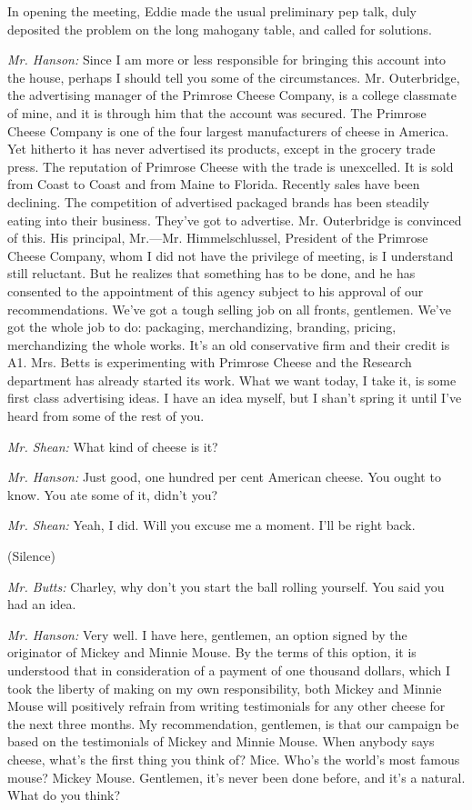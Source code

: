 \documentclass[twoside,nohyper,openany,nobib]{tufte-book}
\begin{document}
In opening the meeting, Eddie made the usual preliminary pep talk, duly
deposited the problem on the long mahogany table, and called for
solutions.

\emph{Mr. Hanson:} Since I am more or less responsible for bringing this
account into the house, perhaps I should tell you some of the
circumstances. Mr. Outerbridge, the advertising manager of the Primrose
Cheese Company, is a college classmate of mine, and it is through him
that the account was secured. The Primrose Cheese Company is one of the
four largest manufacturers of cheese in America. Yet hitherto it has
never advertised its products, except in the grocery trade press. The
reputation of Primrose Cheese with the trade is unexcelled. It is sold
from Coast to Coast and from Maine to Florida. Recently sales have been
declining. The competition of advertised packaged brands has been
steadily eating into their business. They've got to advertise. Mr.
Outerbridge is convinced of this. His principal, Mr.---Mr.
Himmelschlussel, President of the Primrose Cheese Company, whom I did
not have the privilege of meeting, is I understand still reluctant. But
he realizes that something has to be done, and he has consented to the
appointment of this agency subject to his approval of our
recommendations. We've got a tough selling job on all fronts, gentlemen.
We've got the whole job to do: packaging, merchandizing, branding,
pricing, merchandizing the whole works. It's an old conservative firm
and their credit is A1. Mrs. Betts is experimenting with Primrose Cheese
and the Research department has already started its work. What we want
today, I take it, is some first class advertising ideas. I have an idea
myself, but I shan't spring it until I've heard from some of the rest of
you.

\emph{Mr. Shean:} What kind of cheese is it?

\emph{Mr. Hanson:} Just good, one hundred per cent American cheese. You
ought to know. You ate some of it, didn't you?

\emph{Mr. Shean:} Yeah, I did. Will you excuse me a moment. I'll be
right back.

(Silence)

\emph{Mr. Butts:} Charley, why don't you start the ball rolling
yourself. You said you had an idea.

\emph{Mr. Hanson:} Very well. I have here, gentlemen, an option signed
by the originator of Mickey and Minnie Mouse. By the terms of this
option, it is understood that in consideration of a payment of one
thousand dollars, which I took the liberty of making on my own
responsibility, both Mickey and Minnie Mouse will positively refrain
from writing testimonials for any other cheese for the next three
months. My recommendation, gentlemen, is that our campaign be based on
the testimonials of Mickey and Minnie Mouse. When anybody says cheese,
what's the first thing you think of? Mice. Who's the world's most famous
mouse? Mickey Mouse. Gentlemen, it's never been done before, and it's a
natural. What do you think?
\end{document}
